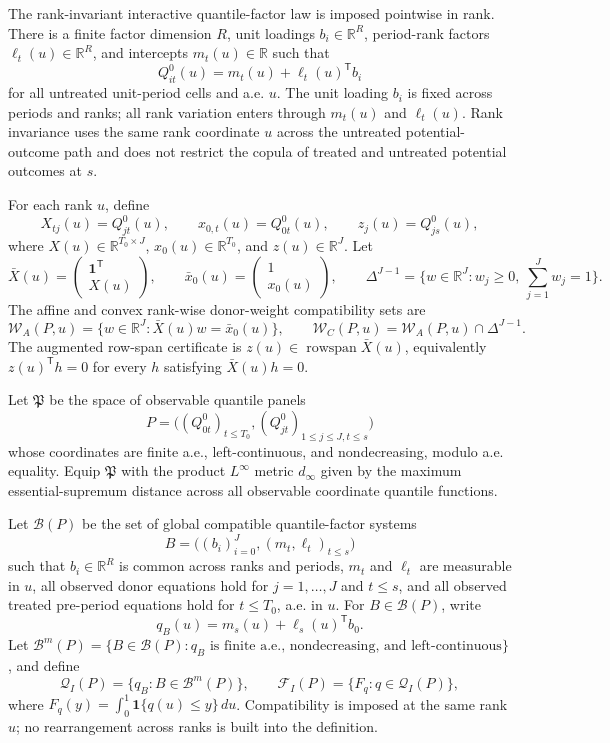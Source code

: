 \documentclass[11pt]{article}
\newcommand{\one}{\mathbf{1}}
\newcommand{\transpose}{\mathsf{T}}
\newcommand{\R}{\mathbb{R}}
\theoremstyle{definition}
\theoremstyle{plain}
\theoremstyle{remark}
\begin{document}
The rank-invariant interactive quantile-factor law is imposed pointwise in rank.  There is a finite factor dimension \(R\), unit loadings \(b_i\in\R^R\), period-rank factors \(\ell_t(u)\in\R^R\), and intercepts \(m_t(u)\in\R\) such that
\[
Q^0_{it}(u)=m_t(u)+\ell_t(u)^\transpose b_i
\]
for all untreated unit-period cells and a.e. \(u\).  The unit loading \(b_i\) is fixed across periods and ranks; all rank variation enters through \(m_t(u)\) and \(\ell_t(u)\).  Rank invariance uses the same rank coordinate \(u\) across the untreated potential-outcome path and does not restrict the copula of treated and untreated potential outcomes at \(s\).

For each rank \(u\), define
\[
X_{tj}(u)=Q^0_{jt}(u),\qquad x_{0,t}(u)=Q^0_{0t}(u),\qquad z_j(u)=Q^0_{js}(u),
\]
where \(X(u)\in\R^{T_0\times J}\), \(x_0(u)\in\R^{T_0}\), and \(z(u)\in\R^J\).  Let
\[
\bar X(u)=\begin{pmatrix}\one^\transpose\\ X(u)\end{pmatrix},\qquad
\bar x_0(u)=\begin{pmatrix}1\\ x_0(u)\end{pmatrix},\qquad
\Delta^{J-1}=\{w\in\R^J:w_j\ge0,\ \sum_{j=1}^J w_j=1\}.
\]
The affine and convex rank-wise donor-weight compatibility sets are
\[
\mathcal{W}_A(P,u)=\{w\in\R^J:\bar X(u)w=\bar x_0(u)\},\qquad
\mathcal{W}_C(P,u)=\mathcal{W}_A(P,u)\cap\Delta^{J-1}.
\]
The augmented row-span certificate is \(z(u)\in\operatorname{rowspan}\bar X(u)\), equivalently \(z(u)^\transpose h=0\) for every \(h\) satisfying \(\bar X(u)h=0\).

Let \(\mathfrak{P}\) be the space of observable quantile panels
\[
P=\big((Q^0_{0t})_{t\le T_0},(Q^0_{jt})_{1\le j\le J,t\le s}\big)
\]
whose coordinates are finite a.e., left-continuous, and nondecreasing, modulo a.e. equality.  Equip \(\mathfrak{P}\) with the product \(L^\infty\) metric \(d_\infty\) given by the maximum essential-supremum distance across all observable coordinate quantile functions.

Let \(\mathcal{B}(P)\) be the set of global compatible quantile-factor systems
\[
B=\big((b_i)_{i=0}^J,(m_t,\ell_t)_{t\le s}\big)
\]
such that \(b_i\in\R^R\) is common across ranks and periods, \(m_t\) and \(\ell_t\) are measurable in \(u\), all observed donor equations hold for \(j=1,\ldots,J\) and \(t\le s\), and all observed treated pre-period equations hold for \(t\le T_0\), a.e. in \(u\).  For \(B\in\mathcal{B}(P)\), write
\[
q_B(u)=m_s(u)+\ell_s(u)^\transpose b_0.
\]
Let \(\mathcal{B}^m(P)=\{B\in\mathcal{B}(P):q_B\text{ is finite a.e., nondecreasing, and left-continuous}\}\), and define
\[
\mathcal{Q}_I(P)=\{q_B:B\in\mathcal{B}^m(P)\},\qquad
\mathcal{F}_I(P)=\{F_q:q\in\mathcal{Q}_I(P)\},
\]
where \(F_q(y)=\int_0^1\one\{q(u)\le y\}\,du\).  Compatibility is imposed at the same rank \(u\); no rearrangement across ranks is built into the definition.
\end{document}
